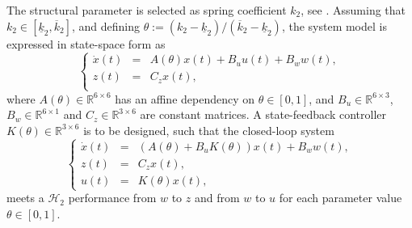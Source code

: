 \documentclass{article}
\newcommand{\ppar}{\theta}                          %
\begin{document}
The structural parameter is selected as spring coefficient $k_2$, see \cite{Camino_2003}. Assuming that $k_2 \in [\underline{k}_2, \overline{k}_2]$, and defining $\ppar := (k_2 - \underline{k}_2)/(\overline{k}_2 - \underline{k}_2)$, the system model is expressed in state-space form as
\begin{equation*}
\left\{ \begin{array}{rcl}
	\dot{x}(t) & = & A(\ppar)x(t) + B_u u(t) + B_w w(t), \\
	z(t) & = & C_z x(t), \\
\end{array} \right.
\end{equation*}
where $A(\ppar) \in \mathbb{R}^{6 \times 6}$ has an affine dependency on $\ppar \in [0,1]$, and $B_u \in \mathbb{R}^{6 \times 3}$, $B_w \in \mathbb{R}^{6 \times 1}$ and $C_z \in \mathbb{R}^{3 \times 6}$ are constant matrices. A state-feedback controller $K(\ppar) \in \mathbb{R}^{3 \times 6}$ is to be designed, such that the closed-loop system
\begin{equation*}
\left\{ \begin{array}{rcl}
	\dot{x}(t) & = & (A(\ppar) + B_u K(\ppar))x(t) + B_w w(t), \\
	z(t) & = & C_z x(t), \\
	u(t) & = & K(\ppar) x(t),
\end{array} \right.
\end{equation*}
meets a $\mathcal{H}_2$ performance from $w$ to $z$ and from $w$ to $u$ for each parameter value $\ppar \in [0,1]$.

\end{document}
